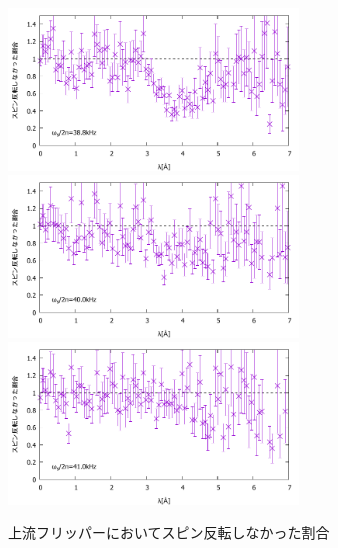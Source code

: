 \begin{figure}[h]
\includegraphics[height=4.3cm]{resonance/analysis/Flipper1_CountsRate_388kHz.pdf}
\includegraphics[height=4.3cm]{resonance/analysis/Flipper1_CountsRate_400kHz.pdf}\\
\includegraphics[height=4.3cm]{resonance/analysis/Flipper1_CountsRate_410kHz.pdf}
\caption{上流フリッパーにおいてスピン反転しなかった割合}\label{Resonance_fig_Flipper1_CountsRate}
\end{figure}

